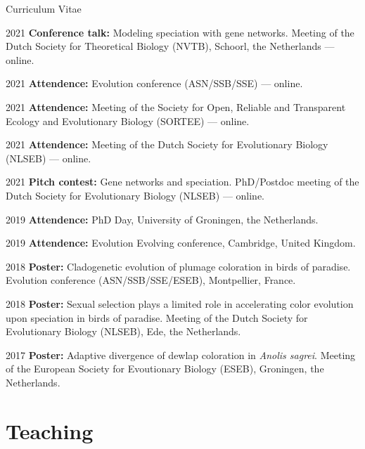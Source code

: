 \documentclass[11pt,a4paper]{article}
\begin{document}
\begin{cv}{Curriculum Vitae}
\begin{cvlist}{}
			\item[2021] 
			\textbf{Conference talk:} Modeling speciation with gene networks. Meeting of the Dutch Society for Theoretical Biology (NVTB), Schoorl, the Netherlands --- online.

            \item[2021]
            \textbf{Attendence:} Evolution conference (ASN/SSB/SSE) --- online.

            \item[2021]
            \textbf{Attendence:} Meeting of the Society for Open, Reliable and Transparent Ecology and Evolutionary Biology (SORTEE) --- online.

            \item[2021]
            \textbf{Attendence:} Meeting of the Dutch Society for Evolutionary Biology (NLSEB) --- online.

            \item[2021]
            \textbf{Pitch contest:} Gene networks and speciation. PhD/Postdoc meeting of the Dutch Society for Evolutionary Biology (NLSEB) --- online.

            \item[2019]
            \textbf{Attendence:} PhD Day, University of Groningen, the Netherlands.

            \item[2019]
            \textbf{Attendence:} Evolution Evolving conference, Cambridge, United Kingdom.
			
			\item[2018] 
			\textbf{Poster:} Cladogenetic evolution of plumage coloration in birds of paradise. Evolution conference (ASN/SSB/SSE/ESEB), Montpellier, France.
			
			\item[2018] 
			\textbf{Poster:} Sexual selection plays a limited role in accelerating color evolution upon speciation in birds of paradise. Meeting of the Dutch Society for Evolutionary Biology (NLSEB), Ede, the Netherlands.
			
			\item[2017] 
			\textbf{Poster:} Adaptive divergence of dewlap coloration in \textit{Anolis sagrei}. Meeting of the European Society for Evoutionary Biology (ESEB), Groningen, the Netherlands.
			
		\end{cvlist}
		
		\section{Teaching}
		

\end{cv}
\end{document}
